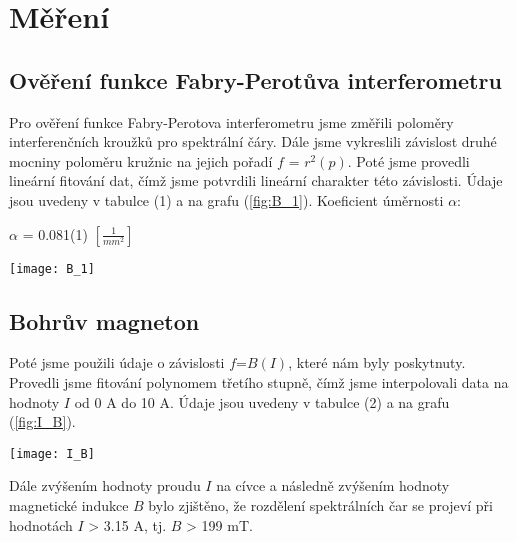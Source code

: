 \documentclass[a4paper,11pt]{article}
\begin{document}
    \begin{minipage}[t]{0.5\textwidth} 
        \section{Měření}   
            \subsection{Ověření funkce Fabry-Perotůva interferometru}
                \par Pro ověření funkce Fabry-Perotova interferometru jsme změřili poloměry interferenčních kroužků pro spektrální čáry. Dále jsme vykreslili závislost druhé mocniny poloměru kružnic na jejich pořadí $f$ = $r^2(p)$. Poté jsme provedli lineární fitování dat, čímž jsme potvrdili lineární charakter této závislosti. Údaje jsou uvedeny v tabulce (1) a na grafu (\ref{fig:B_1}). Koeficient úměrnosti $\alpha$: 

                \begin{center}
                    $\alpha$ = 0.081(1) $\left[\frac{1}{mm^2}\right]$
                \end{center}

                \vspace{10pt}   
                \par \centering
                \texttt{[image: B\_1]}
                \captionsetup{justification=centering, font=footnotesize}
                \label{fig:B_1}
                \vspace{10pt}
                \raggedright

            \subsection{Bohrův magneton}
                \par Poté jsme použili údaje o závislosti $f$=$B(I)$, které nám byly poskytnuty. Provedli jsme fitování polynomem třetího stupně, čímž jsme interpolovali data na hodnoty $I$ od 0 A do 10 A. Údaje jsou uvedeny v tabulce (2) a na grafu (\ref{fig:I_B}).
            
                \vspace{10pt}   
                \par \centering
                \texttt{[image: I\_B]}
                \captionsetup{justification=centering, font=footnotesize}
                \label{fig:I_B}
                \vspace{10pt}
                \raggedright 

                \par Dále zvýšením hodnoty proudu $I$ na cívce a následně zvýšením hodnoty magnetické indukce $B$ bylo zjištěno, že rozdělení spektrálních čar se projeví při hodnotách $I$ > 3.15 A, tj. $B$ > 199 mT. 
                
    \end{minipage}
\end{document}

